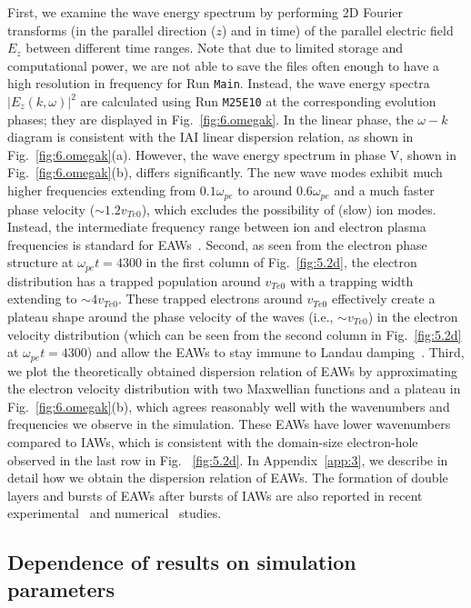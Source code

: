 \documentclass[%
 reprint,
 amsmath,
 amssymb,
 aps,
 prx,
floatfix,
superscriptaddress
]{revtex4-2}
\begin{document}
First, we examine the wave energy spectrum by performing 2D Fourier transforms (in the parallel direction ($z$) and in time) of the parallel electric field $E_z$ between different time ranges. 
Note that due to limited storage and computational power, we are not able to save the files often enough to have a high resolution in frequency for Run {\tt Main}. 
Instead, the wave energy spectra $|E_z(k,\omega)|^2$ are calculated using Run {\tt M25E10} at the corresponding evolution phases; they are displayed in Fig.~\ref{fig:6.omegak}.
In the linear phase, the $\omega-k$ diagram is consistent with the IAI linear dispersion relation, as shown in Fig.~\ref{fig:6.omegak}(a).
However, the wave energy spectrum in phase V, shown in Fig.~\ref{fig:6.omegak}(b), differs significantly.
The new wave modes exhibit much higher frequencies extending from $0.1 \omega_{pe}$ to around $ 0.6 \omega_{pe}$ and a much faster phase velocity ($\sim 1.2v_{Te0}$), which excludes the possibility of (slow) ion modes.
Instead, the intermediate frequency range between ion and electron plasma frequencies is standard for EAWs~\cite{holloway1991undamped}.
Second, as seen from the electron phase structure at $\omega_{pe} t = 4300$ in the first column of Fig.~\ref{fig:5.2d}, the electron distribution has a trapped population around $v_{Te0}$ with a trapping width extending to $\sim 4 v_{Te0}$.
These trapped electrons around $v_{Te0}$ effectively create a plateau shape around the phase velocity of the waves (i.e., $\sim v_{Te0}$) in the electron velocity distribution (which can be seen from the second column in Fig.~\ref{fig:5.2d} at $\omega_{pe}t=4300$) and allow the EAWs to stay immune to Landau damping~\cite{holloway1991undamped}.
Third, we plot the theoretically obtained dispersion relation of EAWs by approximating the electron velocity distribution with two Maxwellian functions and a plateau in Fig.~\ref{fig:6.omegak}(b), which agrees reasonably well with the wavenumbers and frequencies we observe in the simulation.
These EAWs have lower wavenumbers compared to IAWs, which is consistent with the domain-size electron-hole observed in the last row in Fig.
~\ref{fig:5.2d}.
In Appendix~\ref{app:3}, we describe in detail how we obtain the dispersion relation of EAWs.
The formation of double layers and bursts of EAWs after bursts of IAWs are also reported in recent experimental~\cite{zhang2022} and numerical~\cite{zhang2022, chen2022electron} studies. 

\subsection{\label{sec:results_2} Dependence of results on simulation parameters}
\end{document}
